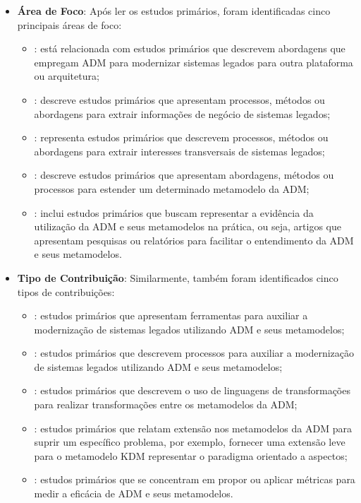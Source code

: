 \begin{itemize}
\item \textbf{Área de Foco}: Após ler os estudos primários, foram identificadas cinco principais áreas de foco: 
    
    \begin{itemize}
        \item {}: está relacionada com estudos primários que descrevem abordagens que empregam ADM para modernizar sistemas legados para outra plataforma ou arquitetura;
        \item {}: descreve estudos primários que apresentam processos, métodos ou abordagens para extrair informações de negócio de sistemas legados;
        \item {}: representa estudos primários que descrevem processos, métodos ou abordagens para extrair interesses transversais de sistemas legados;
        \item {}: descreve estudos primários que apresentam abordagens, métodos ou processos para estender um determinado metamodelo da ADM;
        \item {}: inclui estudos primários que buscam representar a evidência da utilização da ADM e seus metamodelos na prática, ou seja, artigos que apresentam pesquisas ou relatórios para facilitar o entendimento da ADM e seus metamodelos.
    \end{itemize}
    
    \item \textbf{Tipo de Contribuição}: Similarmente, também foram identificados cinco tipos de contribuições:
        
        \begin{itemize}
            \item {}: estudos primários que apresentam ferramentas para auxiliar a modernização de sistemas legados utilizando ADM e seus metamodelos;
            \item {}: estudos primários que descrevem processos para auxiliar a modernização de sistemas legados utilizando ADM e seus metamodelos;
            \item {}: estudos primários que descrevem o uso de linguagens de transformações para realizar transformações entre os metamodelos da ADM;
            \item {}: estudos primários que relatam extensão nos metamodelos da ADM para suprir um específico problema, por exemplo, fornecer uma extensão leve para o metamodelo KDM representar o paradigma orientado a aspectos;
            \item {}: estudos primários que se concentram em propor ou aplicar métricas para medir a eficácia de ADM e seus metamodelos.
        \end{itemize}
        

\end{itemize}
